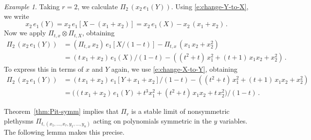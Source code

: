 \documentclass[12pt]{amsart}
\theoremstyle{definition}
\theoremstyle{remark}
\newtheorem{example}[thm]{Example}
\newcommand{\Pisf}{{\mathsf \Pi }}
\begin{document}
\begin{example}\label{ex:Pir}
Taking $r=2$, we calculate $\Pisf _{2}\, (x_{2}\, e_{1}(Y))$.  Using
\eqref{e:change-Y-to-X}, we write
\begin{equation}\label{e:Pir-step-1}
x_{2}\, e_{1}(Y) = x_{2}\, e_{1}[X-(x_{1}+x_{2})] = x_{2}\, e_{1}(X) -
x_{2}\, (x_{1}+x_{2})\, .
\end{equation}
Now we apply $\Pi _{t,x}\otimes \Pi _{t,X}$, obtaining
\begin{equation}\label{e:Pir-step-2}
\begin{aligned}
\Pisf _{2}\, (x_{2}\, e_{1}(Y)) & = (\Pi _{t,x}\, x_{2})\,
e_{1}[X/(1-t)] - \Pi _{t,x}\, (x_{1}\, x_{2} +x_{2}^{2})\\
& = (t\, x_{1}+x_{2})\, e_{1}(X) /(1-t) - ((t^{2} + t)\,
x_{1}^{2}+(t+1)\, x_{1}x_{2}+x_{2}^{2})\, .
\end{aligned}
\end{equation}
To express this in terms of $x$ and $Y$ again, we use
\eqref{e:change-X-to-Y}, obtaining
\begin{equation}\label{e:Pir-step-3}
\begin{aligned}
\Pisf _{2}\, (x_{2}\, e_{1}(Y)) & = (t\, x_{1}+x_{2})\, e_{1}[Y +
x_{1}+x_{2}]/(1-t) - ((t^{2} + t)\, x_{1}^{2}+(t+1)\, x_{1}x_{2}+x_{2}^{2})\\
& = \bigl((t\, x_{1}+x_{2})\, e_{1}(Y) + t^{3} x_{1}^{2}+(t^{2} +t)\,
x_{1}x_{2}+ t\, x_{2}^{2} \bigr)/(1-t)\, .
\end{aligned}
\end{equation}
\end{example}

Theorem~\ref{thm:Pit-symm} implies that $\Pisf _{r}$ is a stable limit
of nonsymmetric plethysms $\Pi
_{t,(x_{1},\ldots,x_{r},y_{1},\ldots,y_{n})}$ acting on polynomials
symmetric in the $y$ variables.  The following lemma makes this
precise.
\end{document}
